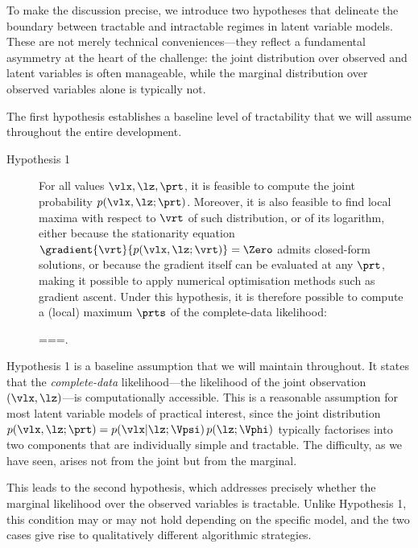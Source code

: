 To make the discussion precise, we introduce two hypotheses that delineate the boundary
between tractable and intractable regimes in latent variable models. These are not merely
technical conveniences---they reflect a fundamental asymmetry at the heart of the
challenge: the joint distribution over observed and latent variables is often manageable,
while the marginal distribution over observed variables alone is typically not.

The first hypothesis establishes a baseline level of tractability that we will assume
throughout the entire development.

\begin{description}
\item[Hypothesis 1]
For all values $\vlx, \lz, \prt$, it is feasible to compute the joint probability
$p(\vlx,\lz; \prt)$. Moreover, it is also feasible to find local maxima with respect to $\vrt$
of such distribution, or of its logarithm, either because the stationarity equation
$\gradient{\vrt}{p(\vlx,\lz; \vrt)}=\Zero$ admits closed-form solutions, or because the
gradient itself can be evaluated at any $\prt$, making it possible to apply numerical
optimisation methods such as gradient ascent. Under this hypothesis, it is therefore
possible to compute a (local) maximum $\prts$ of the complete-data likelihood:
\begin{myequation}
\prts===.
\end{myequation}
\end{description}

Hypothesis 1 is a baseline assumption that we will maintain throughout. It states that the
\emph{complete-data} likelihood---the likelihood of the joint observation $(\vlx, \lz)$---is
computationally accessible. This is a reasonable assumption for most latent variable
models of practical interest, since the joint distribution $p(\vlx,\lz;\prt) =
p(\vlx|\lz;\Vpsi)\,p(\lz;\Vphi)$ typically factorises into two components that are
individually simple and tractable. The difficulty, as we have seen, arises not from the
joint but from the marginal.

This leads to the second hypothesis, which addresses precisely whether the marginal
likelihood over the observed variables is tractable. Unlike Hypothesis 1, this condition may
or may not hold depending on the specific model, and the two cases give rise to
qualitatively different algorithmic strategies.

